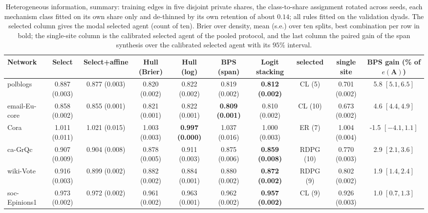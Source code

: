 \documentclass[12pt]{article}
\begin{document}
\begin{table}[ht]
\centering
\caption{Heterogeneous information, summary: training edges in five disjoint private shares, the class-to-share assignment rotated across seeds, each mechanism class fitted on its own share only and de-thinned by its own retention of about $0.14$; all rules fitted on the validation dyads. The selected column gives the modal selected agent (count of ten). Brier over density, mean (s.e.) over ten splits, best combination per row in bold; the single-site column is the calibrated selected agent of the pooled protocol, and the last column the paired gain of the span synthesis over the calibrated selected agent with its $95\%$ interval.}
\label{tab:heterosum}
\begin{tabular}{lccccccccc}
\toprule
Network & Select & Select+affine & Hull (Brier) & Hull (log) & BPS (span) & Logit stacking & selected & single site & BPS gain (\% of $e(\mathbf{A})$) \\
\midrule
polblogs & 0.887 (0.003) & 0.877 (0.003) & 0.820 (0.002) & 0.822 (0.002) & 0.819 (0.002) & \textbf{0.812 (0.002)} & CL (5) & 0.701 (0.002) & 5.8 $[5.1,6.5]$ \\
email-Eu-core & 0.858 (0.002) & 0.855 (0.001) & 0.821 (0.001) & 0.822 (0.001) & \textbf{0.809 (0.001)} & 0.810 (0.002) & CL (10) & 0.673 (0.002) & 4.6 $[4.4,4.9]$ \\
Cora & 1.011 (0.011) & 1.021 (0.015) & 1.003 (0.003) & \textbf{0.997 (0.000)} & 1.037 (0.016) & 1.000 (0.003) & ER (7) & 1.004 (0.004) & -1.5 $[-4.1,1.1]$ \\
ca-GrQc & 0.907 (0.009) & 0.904 (0.008) & 0.878 (0.005) & 0.911 (0.003) & 0.875 (0.006) & \textbf{0.859 (0.008)} & RDPG (10) & 0.770 (0.003) & 2.9 $[2.1,3.6]$ \\
wiki-Vote & 0.916 (0.003) & 0.899 (0.002) & 0.882 (0.002) & 0.884 (0.001) & 0.880 (0.002) & \textbf{0.872 (0.002)} & RDPG (9) & 0.802 (0.002) & 1.9 $[1.4,2.4]$ \\
soc-Epinions1 & 0.973 (0.002) & 0.972 (0.002) & 0.961 (0.002) & 0.963 (0.001) & 0.962 (0.002) & \textbf{0.957 (0.002)} & CL (9) & 0.926 (0.003) & 1.0 $[0.7,1.3]$ \\
\bottomrule
\end{tabular}

\end{table}
\end{document}
